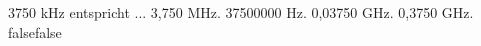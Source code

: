     {3750 kHz entspricht ...}
    {3,750 MHz.}
    {37500000 Hz.}
    {0,03750 GHz.}
    {0,3750 GHz.}
    {false}{false}